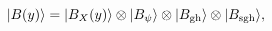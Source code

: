 \begin{equation}
 | B(y) \rangle = | B_X(y) \rangle
                \otimes | B_\psi \rangle
                \otimes  | B_{\rm gh} \rangle
                \otimes | B_{\rm sgh} \rangle,
\end{equation}

